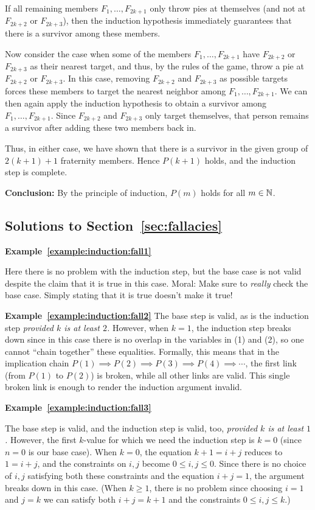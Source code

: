If all remaining members $F_1,\dots, F_{2k+1}$ only throw  pies at themselves
(and  not at $F_{2k+2}$ or $F_{2k+3}$), then the induction hypothesis
immediately guarantees that there is a survivor among these members. 

Now consider the case when some of the members
$F_1,\dots,F_{2k+1}$
have  $F_{2k+2}$ or
$F_{2k+3}$ as their nearest target, and thus, by the rules of the game, throw a
pie at $F_{2k+2}$ or $F_{2k+3}$.  In this case, removing   $F_{2k+2}$ and
$F_{2k+3}$ as possible targets forces these members to target the nearest
neighbor among 
$F_1,\dots,F_{2k+1}$.
We can then again apply   the
induction hypothesis to obtain a survivor among $F_1,\dots,F_{2k+1}$.
Since $F_{2k+2}$ and $F_{2k+3}$ only target themselves, that person remains a
survivor after adding these two members back in. 

Thus, in either case, we have shown that there is a survivor in the given group of 
$2(k+1)+1$ fraternity members. Hence $P(k+1)$ holds, and the induction step is
complete.   

\textbf{Conclusion:} By the principle of induction, $P(m)$ holds for all
$m\in\mathbb{N}$.

\subsection{Solutions to Section~\ref{sec:fallacies} } 

\textbf{Example~\ref{example:induction:fall1}}

Here there is no problem with the induction step, but the base case
is not valid despite the claim that it is true in this case.
Moral: Make sure to \emph{really} check the base case. Simply 
stating that it is true doesn't make it true!

\textbf{Example~\ref{example:induction:fall2}}
The base step is valid, as is the induction step \emph{provided $k$
is at least $2$.} However, when $k=1$, the induction step breaks down since in
this case there is no overlap in the variables in (1) and (2), so one cannot
``chain together'' these equalities. Formally, this means that in the
implication chain $P(1)\implies P(2)\implies P(3)\implies P(4)\implies\cdots$, the
first link (from $P(1)$ to $P(2)$) is broken, while all other links are valid.
This single broken link is enough to render the induction argument invalid.


\textbf{Example~\ref{example:induction:fall3}}

The base step is valid, and the induction step is valid, too,
\emph{provided $k$ is at least $1$.} However, the first $k$-value for which
we need the induction step is $k=0$ (since $n=0$ is our base case). When
$k=0$, the equation $k+1=i+j$ reduces to $1=i+j$, 
and the constraints on $i,j$ become $0\le i,j\le 0$. Since there is no  
choice of $i,j$ satisfying both these constraints  and the equation $i+j=1$,
the argument breaks down in this case. (When $k\ge1$, there is no problem
since choosing $i=1$ and $j=k$ we can satisfy both $i+j=k+1$ and 
the constraints $0\le i,j\le k$.)

